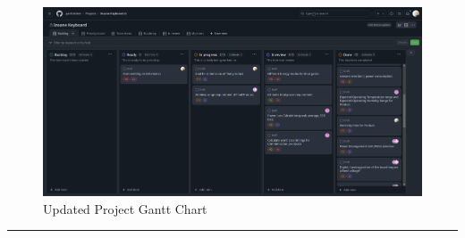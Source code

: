\documentclass[a4paper,11pt]{article}%
\begin{document}
\begin{figure}[h]
    \centering
    \includegraphics[width=\textwidth]{figures/update3}
    \caption{Updated Project Gantt Chart}
    \label{fig:gantt_chart}
\end{figure}


\pagebreak

\hrule






\end{document}
